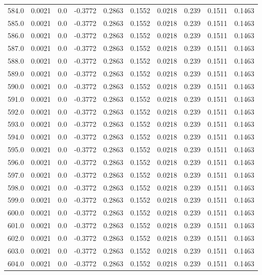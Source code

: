 \begin{longtable}{lrrrrrrrrr}
584.0 & 0.0021 & 0.0 & -0.3772 & 0.2863 & 0.1552 & 0.0218 & 0.239 & 0.1511 & 0.1463 \\
585.0 & 0.0021 & 0.0 & -0.3772 & 0.2863 & 0.1552 & 0.0218 & 0.239 & 0.1511 & 0.1463 \\
586.0 & 0.0021 & 0.0 & -0.3772 & 0.2863 & 0.1552 & 0.0218 & 0.239 & 0.1511 & 0.1463 \\
587.0 & 0.0021 & 0.0 & -0.3772 & 0.2863 & 0.1552 & 0.0218 & 0.239 & 0.1511 & 0.1463 \\
588.0 & 0.0021 & 0.0 & -0.3772 & 0.2863 & 0.1552 & 0.0218 & 0.239 & 0.1511 & 0.1463 \\
589.0 & 0.0021 & 0.0 & -0.3772 & 0.2863 & 0.1552 & 0.0218 & 0.239 & 0.1511 & 0.1463 \\
590.0 & 0.0021 & 0.0 & -0.3772 & 0.2863 & 0.1552 & 0.0218 & 0.239 & 0.1511 & 0.1463 \\
591.0 & 0.0021 & 0.0 & -0.3772 & 0.2863 & 0.1552 & 0.0218 & 0.239 & 0.1511 & 0.1463 \\
592.0 & 0.0021 & 0.0 & -0.3772 & 0.2863 & 0.1552 & 0.0218 & 0.239 & 0.1511 & 0.1463 \\
593.0 & 0.0021 & 0.0 & -0.3772 & 0.2863 & 0.1552 & 0.0218 & 0.239 & 0.1511 & 0.1463 \\
594.0 & 0.0021 & 0.0 & -0.3772 & 0.2863 & 0.1552 & 0.0218 & 0.239 & 0.1511 & 0.1463 \\
595.0 & 0.0021 & 0.0 & -0.3772 & 0.2863 & 0.1552 & 0.0218 & 0.239 & 0.1511 & 0.1463 \\
596.0 & 0.0021 & 0.0 & -0.3772 & 0.2863 & 0.1552 & 0.0218 & 0.239 & 0.1511 & 0.1463 \\
597.0 & 0.0021 & 0.0 & -0.3772 & 0.2863 & 0.1552 & 0.0218 & 0.239 & 0.1511 & 0.1463 \\
598.0 & 0.0021 & 0.0 & -0.3772 & 0.2863 & 0.1552 & 0.0218 & 0.239 & 0.1511 & 0.1463 \\
599.0 & 0.0021 & 0.0 & -0.3772 & 0.2863 & 0.1552 & 0.0218 & 0.239 & 0.1511 & 0.1463 \\
600.0 & 0.0021 & 0.0 & -0.3772 & 0.2863 & 0.1552 & 0.0218 & 0.239 & 0.1511 & 0.1463 \\
601.0 & 0.0021 & 0.0 & -0.3772 & 0.2863 & 0.1552 & 0.0218 & 0.239 & 0.1511 & 0.1463 \\
602.0 & 0.0021 & 0.0 & -0.3772 & 0.2863 & 0.1552 & 0.0218 & 0.239 & 0.1511 & 0.1463 \\
603.0 & 0.0021 & 0.0 & -0.3772 & 0.2863 & 0.1552 & 0.0218 & 0.239 & 0.1511 & 0.1463 \\
604.0 & 0.0021 & 0.0 & -0.3772 & 0.2863 & 0.1552 & 0.0218 & 0.239 & 0.1511 & 0.1463 \\

\end{longtable}
